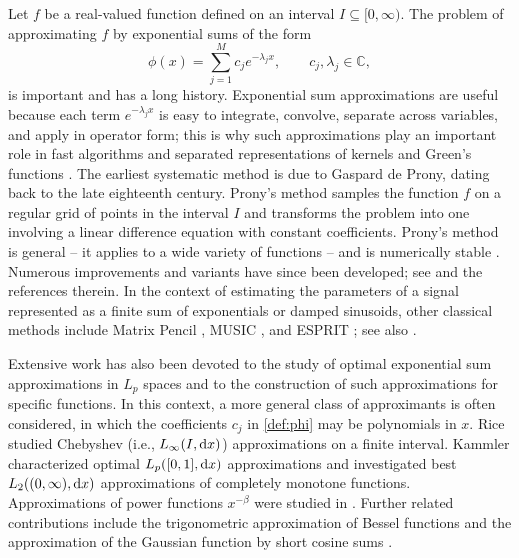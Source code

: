 \documentclass[12pt]{article}
\def\c{{\mathbb C}}
\def\d{{\textnormal d}}
\begin{document}
Let $f$ be a real-valued function defined on an interval $I \subseteq [0,\infty)$. The problem of approximating $f$ by exponential sums of the form
\begin{equation}\label{def:phi}
\phi(x)=\sum_{j=1}^M c_j e^{-\lambda_j x}, \qquad c_j, \lambda_j \in \c,
\end{equation}
is important and has a long history. 
Exponential sum approximations are useful because each term $e^{-\lambda_j x}$ is easy to integrate, convolve, separate across variables, and apply in operator form; this is why such approximations play an important role in fast algorithms and separated representations of kernels and Green’s functions \cite{Beylkin_2005,Beylkin_2010,Hackbusch2019,Jiang2022,Kuznetsov_2022}. The earliest systematic method is due to Gaspard de Prony, dating back to the late eighteenth century. Prony’s method \cite{Fernandez_2018,PlonkaTasche2014} samples the function $f$ on a regular grid of points in the interval $I$ and transforms the problem into one involving a linear difference equation with constant coefficients. Prony’s method is general -- it applies to a wide variety of functions -- and is numerically stable \cite{Katz_2024}. Numerous improvements and variants have since been developed; see \cite{Osborne_1995,Stampfer2020} and the references therein.
In the context of estimating the parameters of a signal represented as a finite sum of exponentials or damped sinusoids, other classical methods include Matrix Pencil \cite{Hua_1990}, MUSIC \cite{Schmidt1986}, and ESPRIT \cite{RoyKailath1989}; see also \cite{DereviankoPlonkaPetz2023,Potts_2013,Stoica_2005}. 

Extensive work has also been devoted to the study of optimal exponential sum approximations in $L_p$ spaces and to the construction of such approximations for specific functions. In this context, a more general class of approximants is often considered, in which the coefficients $c_j$ in \eqref{def:phi} may be polynomials in $x$. Rice \cite{Rice_1962} studied Chebyshev (i.e., $L_{\infty}(I,\d x)$) approximations on a finite interval. Kammler \cite{Kammler_1973, Kammler_1979} characterized optimal $L_p([0,1],\d x)$ approximations and investigated best $L_2((0,\infty),\d x)$ approximations of completely monotone functions. Approximations of power functions $x^{-\beta}$ were studied in \cite{Braess_2009,McLean_2018,Hackbusch_2019}. Further related contributions include the trigonometric approximation of Bessel functions \cite{Cuyt_2020} and the approximation of the Gaussian function by short cosine sums \cite{Derevianko_2023}.
\end{document}
